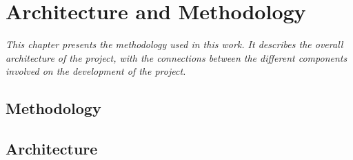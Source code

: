 \chapter{Architecture and Methodology}
\label{chap:architecture}
\textit{This chapter presents the methodology used in this work. It describes the overall architecture of the project, with the connections between the different components involved on the development of the project.}

\clearpage

\section{Methodology}

\clearpage

\section{Architecture}


